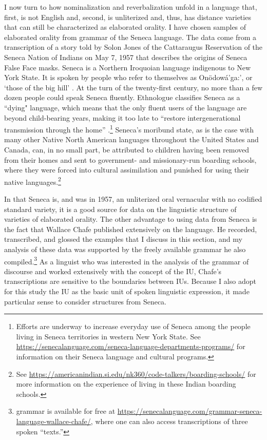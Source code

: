   I now turn to how nominalization and reverbalization unfold in a language that, first, is not English and, second, is unliterized and, thus, has distance varieties that can still be characterized as elaborated orality. I have chosen samples of elaborated orality from  grammar of the Seneca language. The data come from a transcription of a story told by Solon Jones of the Cattaraugus Reservation of the Seneca Nation of Indians on May 7, 1957 that describes the origins of Seneca False Face masks. Seneca is a Northern Iroquoian language indigenous to New York State. It is spoken by people who refer to themselves as Onödowá’ga:’, or ‘those of the big hill’ \citep[1]{Chafe2014}. At the turn of the twenty-first century, no more than a few dozen people could speak Seneca fluently. Ethnologue classifies Seneca as a “dying" language, which means that the only fluent users of the language are beyond child-bearing years, making it too late to “restore intergenerational transmission through the home” \citep{EberhardEtAl2020}.\footnote{{Efforts are underway to increase everyday use of Seneca among the people living in Seneca territories in western New York State. See} \url{https://senecalanguage.com/seneca-language-departments-programs/} {for information on their Seneca language and cultural programs.} } Seneca’s moribund state, as is the case with many other Native North American languages throughout the United States and Canada, can, in no small part, be attributed to children having been removed from their homes and sent to government- and missionary-run boarding schools, where they were forced into cultural assimilation and punished for using their native languages.\footnote{{See} \url{https://americanindian.si.edu/nk360/code-talkers/boarding-schools/} {for more information on the experience of living in these Indian boarding schools.} }

In that Seneca is, and was in 1957, an unliterized oral vernacular with no codified standard variety, it is a good source for data on the linguistic structure of varieties of elaborated orality. The other advantage to using data from Seneca is the fact that Wallace Chafe published extensively on the language. He recorded, transcribed, and glossed the examples that I discuss in this section, and my analysis of these data was supported by the freely available grammar he also compiled.\footnote{ grammar is available for free at \url{https://senecalanguage.com/grammar-seneca-language-wallace-chafe/}, where one can also access transcriptions of three spoken “texts.”} As a linguist who was interested in the analysis of the grammar of discourse and worked extensively with the concept of the IU, Chafe’s transcriptions are sensitive to the boundaries between IUs. Because I also adopt for this study the IU as the basic unit of spoken linguistic expression, it made particular sense to consider structures from Seneca.

